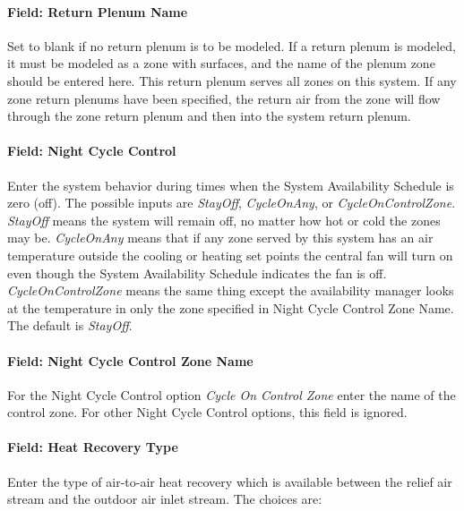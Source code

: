\paragraph{Field: Return Plenum Name}\label{field-return-plenum-name-12}

Set to blank if no return plenum is to be modeled. If a return plenum is modeled, it must be modeled as a zone with surfaces, and the name of the plenum zone should be entered here. This return plenum serves all zones on this system. If any zone return plenums have been specified, the return air from the zone will flow through the zone return plenum and then into the system return plenum.

\paragraph{Field: Night Cycle Control}\label{field-night-cycle-control-5}

Enter the system behavior during times when the System Availability Schedule is zero (off). The possible inputs are \emph{StayOff}, \emph{CycleOnAny}, or \emph{CycleOnControlZone}. \emph{StayOff} means the system will remain off, no matter how hot or cold the zones may be. \emph{CycleOnAny} means that if any zone served by this system has an air temperature outside the cooling or heating set points the central fan will turn on even though the System Availability Schedule indicates the fan is off. \emph{CycleOnControlZone} means the same thing except the availability manager looks at the temperature in only the zone specified in Night Cycle Control Zone Name. The default is \emph{StayOff}.

\paragraph{Field: Night Cycle Control Zone Name}\label{field-night-cycle-control-zone-name-5}

For the Night Cycle Control option \emph{Cycle On Control Zone} enter the name of the control zone. For other Night Cycle Control options, this field is ignored.

\paragraph{Field: Heat Recovery Type}\label{field-heat-recovery-type-7}

Enter the type of air-to-air heat recovery which is available between the relief air stream and the outdoor air inlet stream. The choices are:

